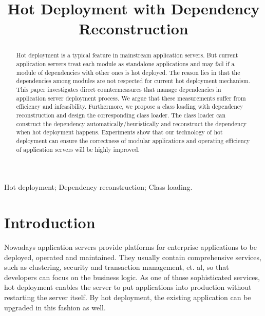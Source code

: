 \documentclass[conference]{IEEEtran}
\begin{document}
\title{Hot Deployment with Dependency Reconstruction}

\author{
}

\maketitle


\begin{abstract}
Hot deployment is a typical feature in mainstream application servers. But current application servers treat each module as standalone applications and may fail if a module of dependencies with other ones is hot deployed. The reason lies in that the dependencies among modules are not respected for current hot deployment mechanism. This paper investigates direct countermeasures that manage dependencies in application server deployment process. We argue that these measurements suffer from efficiency and infeasibility. Furthermore, we propose a class loading with dependency reconstruction and design the corresponding class loader. The class loader can construct the dependency automatically/heuristically and reconstruct the dependency when hot deployment happens. Experiments show that our technology of hot deployment can ensure the correctness of modular applications and operating efficiency of application servers will be highly improved.
\end{abstract}

\begin{IEEEkeywords}
Hot deployment; Dependency reconstruction; Class loading.
\end{IEEEkeywords}


\IEEEpeerreviewmaketitle


\section{Introduction\label{sec:introduction}}

Nowadays application servers\cite{app_server} provide platforms for enterprise applications to be deployed, operated and maintained. They usually contain comprehensive services, such as clustering, security and transaction management, et. al, so that developers can focus on the business logic. As one of those sophisticated services, hot deployment enables the server to put applications into production without restarting the server itself. By hot deployment, the existing application can be upgraded in this fashion as well.
\end{document}
